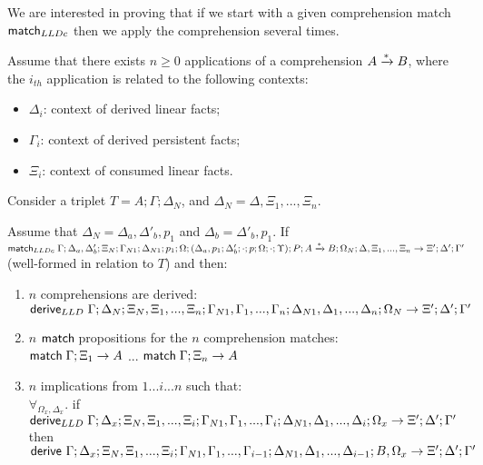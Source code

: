 We are interested in proving that if we start with a given comprehension match $\mathsf{match}_{LLDc}$ then we apply the comprehension several times.

\begin{theorem}\label{thm:multiple_comprehension_derivation}
Assume that there exists $n \geq 0$ applications of a comprehension $A \xrightarrow{*} B$, where the $i_{th}$ application is related to the following contexts:
\begin{itemize}
   \item $\Delta_i$: context of derived linear facts;
   \item $\Gamma_i$: context of derived persistent facts;
   \item $\Xi_i$: context of consumed linear facts.
\end{itemize}
Consider a triplet $T = A; \Gamma; \Delta_{N}$, and $\Delta_N = \Delta, \Xi_1, ..., \Xi_n$.

Assume that $\Delta_N = \Delta_a, \Delta'_b, p_1$ and $\Delta_b = \Delta'_b, p_1$.
If $\mathsf{match}_{LLDc} \; \Gamma; \Delta_a, \Delta'_b; \Xi_N; \Gamma_{N1}; \Delta_{N1}; p_1; \Omega; (\Delta_a, p_1; \Delta'_b; \cdot; p; \Omega; \cdot; \Upsilon); P; A \xrightarrow{*} B; \Omega_N; \Delta, \Xi_1, ..., \Xi_n \rightarrow \Xi'; \Delta'; \Gamma'$ (well-formed in relation to $T$) and then:
   
   \begin{enumerate}
      \item $n$ comprehensions are derived:\\
      $\mathsf{derive}_{LLD} \; \Gamma; \Delta_N; \Xi_N, \Xi_1, ..., \Xi_n; \Gamma_{N1}, \Gamma_1, ..., \Gamma_n; \Delta_{N1}, \Delta_1, ..., \Delta_n; \Omega_N \rightarrow \Xi'; \Delta'; \Gamma'$
      \item $n$ $\mathsf{match} \;$propositions for the $n$ comprehension matches:\\
      $\mathsf{match} \; \Gamma; \Xi_1 \rightarrow A$ ... $\mathsf{match} \; \Gamma; \Xi_n \rightarrow A$
      \item $n$ implications from $1...i...n$ such that: \\
      $\forall_{\Omega_x, \Delta_x}.$ if $\mathsf{derive}_{LLD} \; \Gamma; \Delta_x; \Xi_N, \Xi_1, ..., \Xi_i; \Gamma_{N1}, \Gamma_1, ..., \Gamma_i; \Delta_{N1}, \Delta_1, ..., \Delta_i; \Omega_x \rightarrow \Xi'; \Delta'; \Gamma'$ then \linebreak $\mathsf{derive}~ \Gamma; \Delta_x; \Xi_N, \Xi_1, ..., \Xi_i; \Gamma_{N1}, \Gamma_1, ..., \Gamma_{i-1}; \Delta_{N1}, \Delta_1, ..., \Delta_{i-1}; B, \Omega_x \rightarrow \Xi'; \Delta'; \Gamma'$
   \end{enumerate}
   

\end{theorem}
